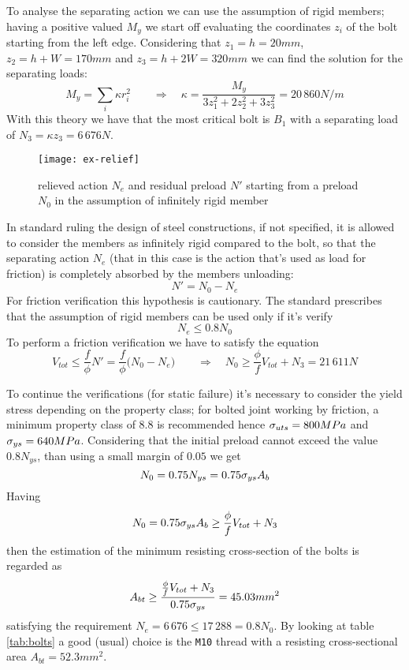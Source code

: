 	To analyse the separating action we can use the assumption of rigid members; having a positive valued $M_y$ we start off evaluating the coordinates $z_i$ of the bolt starting from the left edge. Considering that $z_1 = h = 20mm$, $z_2 = h + W = 170mm$ and $z_3 = h + 2W = 320mm$ we can find the solution for the separating loads:
	\[ M_y = \sum_i \kappa r_i^2 \qquad \Rightarrow \quad \kappa = \frac{M_y}{3z_1^2 + 2z_2^2 +3 z_3^2} = 20\,860 N/m \]
	With this theory we have that the most critical bolt is $B_1$ with a separating load of $N_3 = \kappa z_3 = 6\,676 N$.
	\begin{SCfigure}[2][t]
		\centering \texttt{[image: ex-relief]}
		\caption{relieved action $N_e$ and residual preload $N'$ starting from a preload $N_0$ in the assumption of infinitely rigid member} \label{ex:reliefload }
	\end{SCfigure}
	In standard ruling the design of steel constructions, if not specified, it is allowed to consider the members as infinitely rigid compared to the bolt, so that the separating action $N_e$ (that in this case is the action that's used as load for friction) is completely absorbed by the members unloading:
	\[ N' = N_0 - N_e \]
	For friction verification this hypothesis is cautionary. The standard prescribes that the assumption of rigid members can be used only if it's verify
	\[ N_e \leq 0.8 N_0 \]
	To perform a friction verification we have to satisfy the equation
	\[ V_{tot} \leq \frac f \phi N' = \frac f \phi \big(N_0-N_e\big) \qquad \Rightarrow \quad N_0 \geq \frac \phi f V_{tot} + N_3 = 21\,611 N \]
	
	To continue the verifications (for static failure) it's necessary to consider the yield stress depending on the property class; for bolted joint working by friction, a minimum property class of 8.8 is recommended hence $\sigma_{uts} = 800MPa$ and $\sigma_{ys} = 640MPa$. Considering that the initial preload cannot exceed the value $0.8 N_{ys}$, than using a small margin of $0.05$ we get
	\[ N_0 = 0.75 N_{ys} = 0.75 \sigma_{ys} A_b  \]
	Having
	\[ N_0 = 0.75 \sigma_{ys} A_b \geq \frac \phi f V_{tot} + N_3 \]
	then the estimation of the minimum resisting cross-section of the bolts is regarded as
	\[ A_{bt} \geq \frac{\frac \phi f V_{tot} + N_3}{0.75 \sigma_{ys}} = 45.03mm^2 \]
	satisfying the requirement $N_e = 6\,676 \leq 17\,288 = 0.8 N_0$. By looking at table \ref{tab:bolts} a good (usual) choice is the \texttt{M10} thread with a resisting cross-sectional area $A_{bt} = 52.3mm^2$.
	 
	
	
	
	
	
	